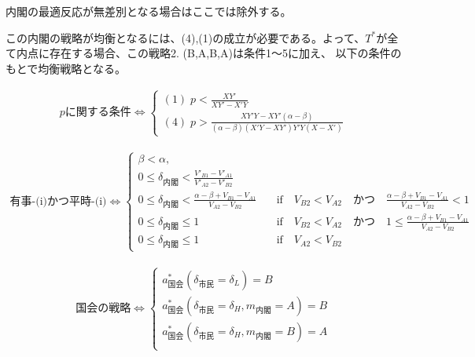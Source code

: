\documentclass[main.tex]{subfiles}
\begin{document}
内閣の最適反応が無差別となる場合はここでは除外する。

この内閣の戦略が均衡となるには、(4),(1)の成立が必要である。よって、$T^*$が全て内点に存在する場合、この戦略2. (B,A,B,A)は条件1〜5に加え、
以下の条件のもとで均衡戦略となる。


\begin{align*}
    p\text{に関する条件} \Leftrightarrow 
    \begin{cases}
        (1)\; p < \frac{XY'}{XY' - X'Y} \\[0.5em]
        (4)\; p  > \frac{XY'Y - XY'(\alpha - \beta)}{ (\alpha - \beta)( X'Y- XY')Y'Y(X - X') } 
     \end{cases}
\end{align*}


\begin{align*}
    \text{有事-(i)かつ平時-(i)} \Leftrightarrow 
    \begin{cases}
        \beta < \alpha, \\
        0 \le \delta_{内閣} < \frac{V'_{B1}-V'_{A1}}{V'_{A2} - V'_{B2}}\\
        0 \le \delta_{内閣} < \frac{\alpha-\beta + V_{B1}-V_{A1}}{V_{A2} - V_{B2}} \quad&\text{if}\quad V_{B2} < V_{A2} \quad{かつ}\quad \frac{\alpha-\beta + V_{B1}-V_{A1}}{V_{A2} - V_{B2}}<1\\
        0 \le \delta_{内閣} \le 1 \quad&\text{if}\quad V_{B2} < V_{A2} \quad{かつ}\quad 1 \le \frac{\alpha-\beta + V_{B1}-V_{A1}}{V_{A2} - V_{B2}}\\
        0 \le \delta_{内閣} \le 1 \quad&\text{if}\quad V_{A2} < V_{B2}
    \end{cases}
\end{align*}


\begin{align*}
    \text{国会の戦略} \Leftrightarrow 
    \begin{cases}
        a^*_{国会}(\delta_{市民}=\delta_L) = B \\[0.5em]
        a^*_{国会}(\delta_{市民}=\delta_H, m_{内閣} = A) = B \\[0.5em]
        a^*_{国会}(\delta_{市民}=\delta_H, m_{内閣} = B) = A \\[0.5em]
     \end{cases}
\end{align*}
\end{document}
